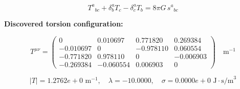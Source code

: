 
\begin{equation}
  T^a{}_{bc} + \delta^a_b T_c - \delta^a_c T_b = 8\pi G \, s^a{}_{bc}
\end{equation}

\textbf{Discovered torsion configuration:}

\begin{equation}
  T^{\mu\nu} = \begin{pmatrix}
    0 & 0.010697 & 0.771820 & 0.269384 \\
    -0.010697 & 0 & -0.978110 & 0.060554 \\
    -0.771820 & 0.978110 & 0 & -0.006903 \\
    -0.269384 & -0.060554 & 0.006903 & 0
  \end{pmatrix} \quad \text{m}^{-1}
\end{equation}

\begin{equation}
  |T| = 1.2762e+0 \text{ m}^{-1}, \quad
  \lambda = -10.0000, \quad
  \sigma = 0.0000e+0 \text{ J}\cdot\text{s/m}^3
\end{equation}